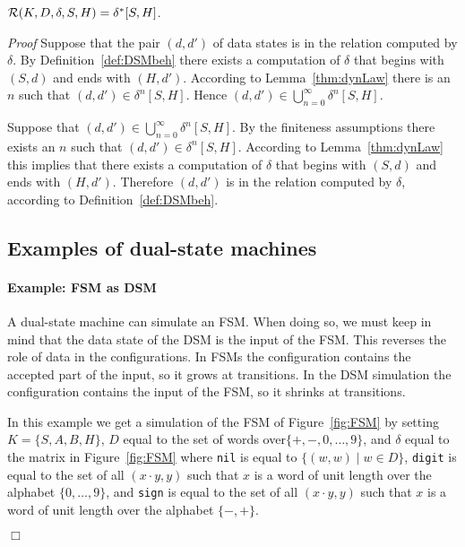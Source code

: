 \documentclass[preprint,11pt]{elsarticle}
\begin{document}
\begin{theorem}
$\mathcal{R}(K,D,\delta,S,H) = \delta^*[S,H]$.
\end{theorem}

\emph{Proof}
Suppose that the pair $(d,d')$ of data states
is in the relation computed by $\delta$.
By Definition~\ref{def:DSMbeh}
there exists a computation of $\delta$ that begins with $(S,d)$
and ends with $(H,d')$.
According to Lemma~\ref{thm:dynLaw}
there is an $n$ such that
$(d,d') \in \delta^n[S,H]$.
Hence $(d,d') \in \bigcup_{n=0}^\infty \delta^n[S,H]$.

Suppose that $(d,d') \in \bigcup_{n=0}^\infty \delta^n[S,H]$.
By the finiteness assumptions there exists an $n$ such that
$(d,d') \in \delta^n[S,H]$.
According to Lemma~\ref{thm:dynLaw}
this implies that there exists a computation of $\delta$
that begins with $(S,d)$ and ends with $(H,d')$.
Therefore $(d,d')$ is in the relation computed by $\delta$,
according to Definition~\ref{def:DSMbeh}.

\subsection{Examples of dual-state machines}

\paragraph{Example: FSM as DSM}
A dual-state machine can simulate an FSM.
When doing so, we must keep in mind that the data state
of the DSM is the input of the FSM.
This reverses the role of data in the configurations.
In FSMs the configuration contains the accepted part
of the input, so it grows at transitions.
In the DSM simulation the configuration contains the input of the FSM,
so it shrinks at transitions.

In this example we get a simulation of
the FSM of Figure~\ref{fig:FSM}
by setting $K = \{S,A,B,H\}$,
$D$ equal to the set of words over$\{+,-,0,\ldots,9\}$,
and $\delta$ equal to the matrix in Figure~\ref{fig:FSM}
where {\tt nil} is equal to
$\{(w,w) \mid w \in D\}$,
\verb"digit" is equal to the set of all
$(x\cdot y,y)$ such that $x$ is a word of unit length
over the alphabet $\{0,\ldots,9\}$,
and \verb"sign" is equal to the set of all
$(x\cdot y,y)$ such that $x$ is a word of unit length
over the alphabet $\{-,+\}$.\\[-0.9cm]
\begin{flushright}$\Box$\end{flushright}
\end{document}
